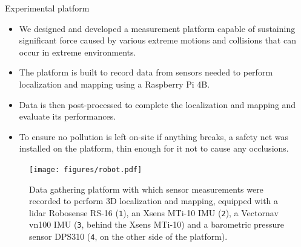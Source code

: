 \documentclass[final,hyperref={pdfpagelabels=false}]{beamer}
\begin{document}
\begin{frame}[t]
\begin{columns}[t]
\begin{column}{.465\textwidth}
\begin{block}{Experimental platform}
	\begin{itemize}
		\item We designed and developed a measurement platform capable of sustaining significant force caused by various extreme motions and collisions that can occur in extreme environments.
		\item The platform is built to record data from sensors needed to perform localization and mapping using a Raspberry Pi 4B.
		\item Data is then post-processed to complete the localization and mapping and evaluate its performances.
		\item To ensure no pollution is left on-site if anything breaks, a safety net was installed on the platform, thin enough for it not to cause any occlusions.
	\end{itemize}
	\centering
	\begin{figure}
		\texttt{[image: figures/robot.pdf]}
		\caption{Data gathering platform with which sensor measurements were recorded to perform 3D localization and mapping, equipped with a lidar Robosense RS-16 (\texttt{1}), an Xsens MTi-10 IMU (\texttt{2}), a Vectornav vn100 IMU (\texttt{3}, behind the Xsens MTi-10) and a barometric pressure sensor DPS310 (\texttt{4}, on the other side of the platform).}
	\end{figure}
\end{block}


\end{column}
\end{columns}
\end{frame}
\end{document}

